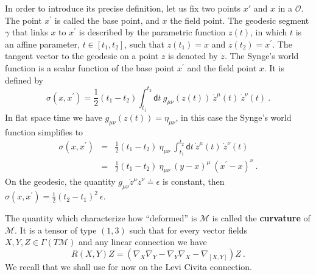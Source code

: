 \documentclass[11pt]{book}
\newcommand{\Mcal}{\mathcal{M}}
\newcommand{\Ocal}{\mathcal{O}}
\newcommand{\dsf}{\mathsf{d}}
\theoremstyle{break}
\begin{document}
In order to introduce its precise definition, let us fix two points $x'$ and $x$ in a $\Ocal$.
The point $x^\prime$ is called the base point, and $x$ the field point. The geodesic segment $\gamma$ that links $x$ to $x^\prime$ is described by the parametric function $z(t)$, in which $t$ is an affine parameter, $t \in \left[ t_1 , t_2 \right]$, such that $z(t_1) = x$ and $z(t_2) = x^\prime$. The tangent vector to the geodesic on a point $z$ is denoted by $\dot{z}$. The Synge's world function is a scalar function of the base point $x^\prime$ and the field point $x$. It is defined by
%
\begin{equation*}
\sigma(x,x^\prime) =  \frac{1}{2} (t_1 - t_2) \int_{t_1}^{t_2} \dsf t \ g_{\mu \nu} \left( z(t) \right) \ \dot{z}^\mu(t) \ \dot{z}^{\nu}(t) \ .
\end{equation*}
%
In flat space time we have $g_{\mu \nu} \left( z(t) \right) = \eta_{\mu \nu}$, in this case the Synge's world function simplifies to
%
\begin{eqnarray*}
\sigma(x,x^\prime) &=& \frac{1}{2} (t_1 - t_2) \ \eta_{\mu \nu} \ \int_{t_1}^{t_2} \dsf t \ \dot{z}^\mu(t) \ \dot{z}^{\nu}(t) \\
&=& \frac{1}{2} (t_1 - t_2) \ \eta_{\mu \nu} \ (y-x)^\mu \ (x^\prime-x)^\nu \ .
\end{eqnarray*}
%
On the geodesic, the quantity $g_{\mu \nu} \dot{z}^\mu \dot{z}^\nu \doteq \epsilon$ is constant, then $\sigma(x,x^\prime) = \frac{1}{2} (t_2-t_1)^2 \ \epsilon$.



The quantity which characterize how ``deformed'' is $\Mcal$ is called the \textbf{curvature} of $\Mcal$. It is a tensor of type $(1,3)$ such that for every vector fields $X, Y, Z \in \Gamma(T\Mcal)$ and any linear connection we have
%
\begin{equation*}
R(X,Y)Z = \left( \nabla_X \nabla_Y - \nabla_Y \nabla_X - \nabla_{[X,Y]} \right) Z \ .
\end{equation*}
%
We recall that we shall use for now on the Levi Civita connection. %
%
%
\end{document}
